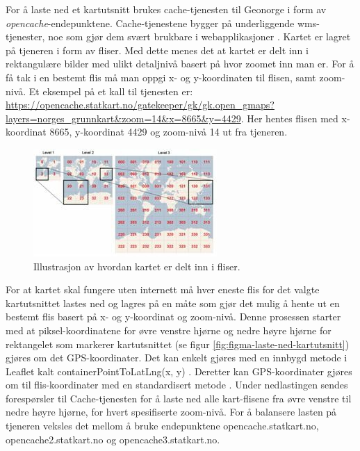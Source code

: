 \noindent
For å laste ned et kartutsnitt brukes cache-tjenesten til Geonorge i form av \textit{opencache}-endepunktene. Cache-tjenestene bygger på underliggende \acrshort{wms}-tjenester, noe som gjør dem svært brukbare i webapplikasjoner \cite{GeoNorgeLeaflet}. Kartet er lagret på tjeneren i form av fliser. Med dette menes det at kartet er delt inn i rektangulære bilder med ulikt detaljnivå basert på hvor zoomet inn man er. For å få tak i en bestemt flis må man oppgi x- og y-koordinaten til flisen, samt zoom-nivå. Et eksempel på et kall til tjenesten er:
\url{https://opencache.statkart.no/gatekeeper/gk/gk.open_gmaps?layers=norges_grunnkart&zoom=14&x=8665&y=4429}. Her hentes flisen med x-koordinat 8665, y-koordinat 4429 og zoom-nivå 14 ut fra tjeneren.
\begin{figure}[H]
\centering
\captionsetup{width=.8\linewidth}
\includegraphics[scale=1.0]{Figurer/Bilder/tilesitiles.jpg}
\caption{Illustrasjon av hvordan kartet er delt inn i fliser.}
\label{fig:map-tiles}
\end{figure}

\noindent
For at kartet skal fungere uten internett må hver eneste flis for det valgte kartutsnittet lastes ned og lagres på en måte som gjør det mulig å hente ut en bestemt flis basert på x- og y-koordinat og zoom-nivå. Denne prosessen starter med at piksel-koordinatene for øvre venstre hjørne og nedre høyre hjørne for rektangelet som markerer kartutsnittet (se figur \ref{fig:figma-laste-ned-kartutsnitt}) gjøres om det GPS-koordinater. Det kan enkelt gjøres med en innbygd metode i Leaflet kalt containerPointToLatLng({x, y}) \cite{LeafletDom}. Deretter kan GPS-koordinater gjøres om til flis-koordinater med en standardisert metode \cite{SlippyMapTilenames}. Under nedlastingen sendes forespørsler til Cache-tjenesten for å laste ned alle kart-flisene fra øvre venstre til nedre høyre hjørne, for hvert spesifiserte zoom-nivå. For å balansere lasten på tjeneren veksles det mellom å bruke endepunktene opencache.statkart.no, opencache2.statkart.no og opencache3.statkart.no.
\newline

